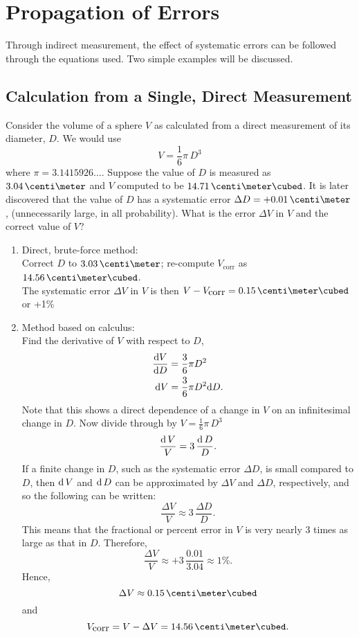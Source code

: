 \section{Propagation of Errors}
\label{sec:ErrorPropagation}

Through indirect measurement, the effect of systematic errors can be followed through the equations used. Two simple examples will be discussed.

\subsection{Calculation from a Single, Direct Measurement}

Consider the volume of a sphere $V$ as calculated from a direct measurement of its diameter, $D$.  We would use
\[
  V = \frac{1}{6} \pi \, D^3
\]
where $\pi = 3.1415926\ldots$.  Suppose the value of $D$ is measured as $3.04\,\centi\meter$ and $V$ computed to be $14.71\,\centi\meter\cubed$. It is later discovered that the value of $D$ has a systematic error $\Delta D = +0.01\,\centi\meter$, (unnecessarily large, in all probability). What is the error $\Delta V$ in $V$ and the correct value of $V$?

\begin{enumerate}
\item Direct, brute-force method:\\
  Correct $D$ to $3.03\,\centi\meter$; re-compute $V_{\mbox{corr}}$ as $14.56\,\centi\meter\cubed$.\\
  The systematic error $\Delta V$ in $V$ is then $V - V_{\mbox{corr}} = 0.15\,\centi\meter\cubed$ or +1\%
\item Method based on calculus:\\
  Find the derivative of $V$ with respect to $D$,
  \begin{equation}
    \label{Eq:errorCalcMethod}
    \begin{aligned} %
      \frac{{\rm d}V}{{\rm d}D} &= \frac{3}{6} \pi D^2\\
           {\rm d}V             &= \frac{3}{6} \pi D^2 {\rm d}D.
    \end{aligned}
  \end{equation}
  Note that this shows a direct dependence of a change in $V$ on an infinitesimal change in $D$. Now divide through by $V = \frac{1}{6} \pi \, D^3$
  \[
    \frac{{\rm d}\,V}{V} = 3 \, \frac{{\rm d}\, D}{D}.
  \]
  If a finite change in $D$, such as the systematic error $\Delta D$, is small compared to $D$, then ${\rm d}\,V$ and ${\rm d}\,D$ can be approximated by $\Delta V$ and $\Delta D$, respectively, and so the following can be written:
  \[
    \frac{\Delta V}{V} \approx 3 \, \frac{\Delta D}{D}.
  \]
  This means that the fractional or percent error in $V$ is very nearly 3 times as large as that in $D$. Therefore,
  \[
    \frac{\Delta V}{V} \approx + 3 \, \frac{0.01}{3.04} \approx 1 \%.
  \]
  Hence,
  \[
    \Delta V \approx 0.15\,\centi\meter\cubed
  \]
  and
  \[
    V_{\mbox{corr}} = V - \Delta V = 14.56\,\centi\meter\cubed.
  \]
\end{enumerate}

